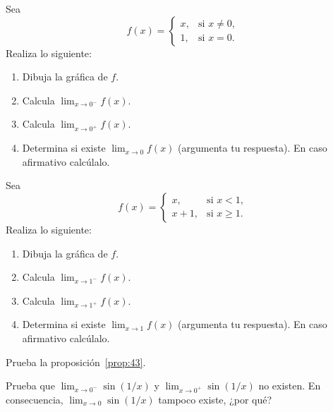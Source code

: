 \documentclass[12pt,a4paper]{book}
\begin{document}
    \begin{ejercicio}\label{ej:155}
        Sea
        \begin{equation*}
            f(x)=\begin{cases}
                x, & \text{si }x\neq 0,\\
                1, & \text{si }x=0.
            \end{cases}
        \end{equation*}
        Realiza lo siguiente:
        \begin{enumerate}[nosep]
            \item Dibuja la gráfica de $f$.
            \item Calcula $\lim_{x\to 0^{-}}f(x)$.
            \item Calcula $\lim_{x\to 0^{+}}f(x)$.
            \item Determina si existe $\lim_{x\to 0}f(x)$ (argumenta tu respuesta). En caso afirmativo
            calcúlalo.
        \end{enumerate}
    \end{ejercicio}

    \begin{ejercicio}\label{ej:156}
        Sea
        \begin{equation*}
            f(x)=\begin{cases}
                x, & \text{si }x<1,\\
                x+1, & \text{si }x\geq 1.
            \end{cases}
        \end{equation*}
        Realiza lo siguiente:
        \begin{enumerate}[nosep]
            \item Dibuja la gráfica de $f$.
            \item Calcula $\lim_{x\to 1^{-}}f(x)$.
            \item Calcula $\lim_{x\to 1^{+}}f(x)$.
            \item Determina si existe $\lim_{x\to 1}f(x)$ (argumenta tu respuesta). En caso afirmativo
            calcúlalo.
        \end{enumerate}
    \end{ejercicio}

    \begin{ejercicio}\label{ej:157}
        Prueba la proposición~\ref{prop:43}.
    \end{ejercicio}

    \begin{ejercicio}\label{ej:158}
        Prueba que $\lim_{x\to 0^{-}}\sin(1/x)$ y $\lim_{x\to 0^{+}}\sin(1/x)$ no existen.
        En consecuencia, $\lim_{x\to 0}\sin(1/x)$ tampoco existe, ¿por qué?
    \end{ejercicio}
\end{document}
